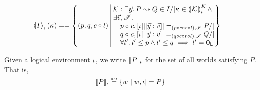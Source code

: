 \begin{definition}
\begin{align*}
		\semI[\lenv]{I}(\ca{}) &==
	  \left\{
	  \begin{array}{@{}l@{\ }|@{\ }r@{}}
	    (p, q, c \composeL l)&
	    \begin{array}{@{}l@{}}
	      \interAss{\capAss{}}{\vec{y}}{P}{Q} \in I /| \ca{} \in \semK[\lenv]{\capAss{}}\land\\
	      \exsts{\vec{v}, \lmod}\\
	      \quad p \composeL c, [\lenv|||\vec y:\vec v] |=_{(p  \composeL c \composeL r \composeL l), \lmod} P /| \\
	      \quad q \composeL c, [\lenv|||\vec y:\vec v] |=_{(q  \composeL c \composeL r \composeL l), \lmod} Q /| \\
	      \quad \for{l'} l' \leq p \land l' \leq q \implies l' = \unitL
	    \end{array}
	  \end{array}
	  \right\}
  \end{align*}
\end{definition}
%
\noindent Given a logical environment $\lenv$, we write $\sem[\lenv]{P}$ for the set of all worlds satisfying $P$. That is, 
%
\[
	\sem[\lenv]{P} \eqdef \left\{ w \mid w, \lenv |= P \right\}
\]	
%
%

